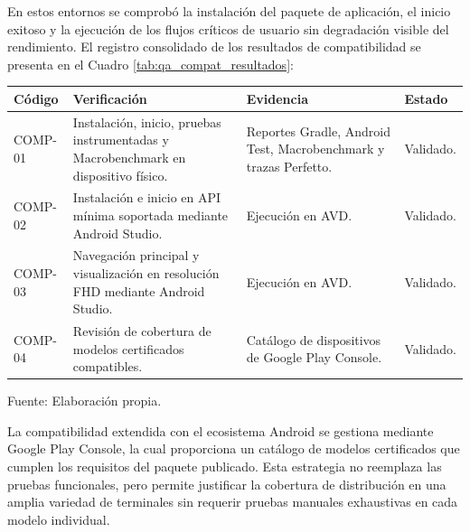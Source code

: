 \begin{enumerate}
En estos entornos se comprobó la instalación del paquete de aplicación, el inicio exitoso y la ejecución de los flujos críticos de usuario sin degradación visible del rendimiento. El registro consolidado de los resultados de compatibilidad se presenta en el Cuadro \ref{tab:qa_compat_resultados}:

\begin{center}
\begin{minipage}{\linewidth}
\centering
\begin{tabularx}{\linewidth}{@{}p{1.8cm}>{\RaggedRight\arraybackslash}X>{\RaggedRight\arraybackslash}p{3.2cm}>{\RaggedRight\arraybackslash}p{2.7cm}@{}}
\toprule
Código & Verificación & Evidencia & Estado \\
\midrule
COMP-01 & Instalación, inicio, pruebas instrumentadas y Macrobenchmark en dispositivo físico. & Reportes Gradle, Android Test, Macrobenchmark y trazas Perfetto. & Validado. \\
COMP-02 & Instalación e inicio en API mínima soportada mediante Android Studio. & Ejecución en AVD. & Validado. \\
COMP-03 & Navegación principal y visualización en resolución FHD mediante Android Studio. & Ejecución en AVD. & Validado. \\
COMP-04 & Revisión de cobertura de modelos certificados compatibles. & Catálogo de dispositivos de Google Play Console. & Validado. \\
\bottomrule
\end{tabularx}
\label{tab:qa_compat_resultados}
Fuente: Elaboración propia.
\end{minipage}
\end{center}

La compatibilidad extendida con el ecosistema Android se gestiona mediante Google Play Console, la cual proporciona un catálogo de modelos certificados que cumplen los requisitos del paquete publicado. Esta estrategia no reemplaza las pruebas funcionales, pero permite justificar la cobertura de distribución en una amplia variedad de terminales sin requerir pruebas manuales exhaustivas en cada modelo individual.
\end{enumerate}
